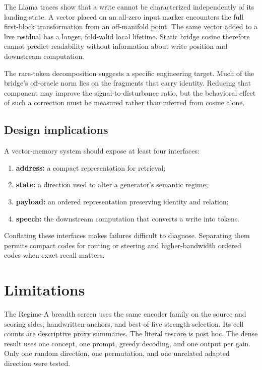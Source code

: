 \documentclass[11pt]{article}
\begin{document}
The Llama traces show that a write cannot be characterized independently of its
landing state. A vector placed on an all-zero input marker encounters the full
first-block transformation from an off-manifold point. The same vector added to
a live residual has a longer, fold-valid local lifetime. Static bridge cosine
therefore cannot predict readability without information about write position
and downstream computation.

The rare-token decomposition suggests a specific engineering target. Much of
the bridge's off-oracle norm lies on the fragments that carry identity. Reducing
that component may improve the signal-to-disturbance ratio, but the behavioral
effect of such a correction must be measured rather than inferred from cosine
alone.

\subsection{Design implications}


A vector-memory system should expose at least four interfaces:

\begin{enumerate}
\item \textbf{address:} a compact representation for retrieval;
\item \textbf{state:} a direction used to alter a generator's semantic regime;
\item \textbf{payload:} an ordered representation preserving identity and relation;
\item \textbf{speech:} the downstream computation that converts a write into tokens.
\end{enumerate}


Conflating these interfaces makes failures difficult to diagnose. Separating
them permits compact codes for routing or steering and higher-bandwidth ordered
codes when exact recall matters.

\section{Limitations}


The Regime-A breadth screen uses the same encoder family on the source and
scoring sides, handwritten anchors, and best-of-five strength selection. Its
cell counts are descriptive proxy summaries. The literal rescore is post hoc.
The dense result uses one concept, one prompt, greedy decoding, and one output
per gain. Only one random direction, one permutation, and one unrelated adapted
direction were tested.
\end{document}

